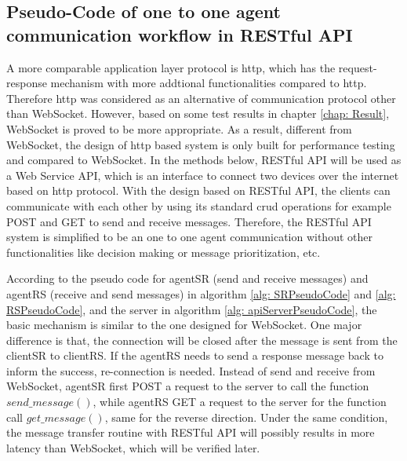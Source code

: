 \subsection{Pseudo-Code of one to one agent communication workflow in RESTful API}
A more comparable application layer protocol is \gls{http}, which has the request-response mechanism with more addtional functionalities compared to \gls{http}. 
Therefore \gls{http} was considered as an alternative of communication protocol other than WebSocket. 
However, based on some test results in chapter \ref{chap: Result}, WebSocket is 
proved to be more appropriate.
As a result, different from WebSocket, the design of \gls{http} based system is only built 
for performance testing and compared to WebSocket. In the methods below, RESTful API will be used 
as a Web Service API, which is an interface to connect two devices over the internet based on 
\gls{http} protocol. With the design based on RESTful API, the clients can communicate with each other 
by using its standard \gls{crud} operations for example POST and GET to send and receive messages. 
Therefore, the RESTful API system is simplified to be an one to one agent communication without other functionalities like decision making or message prioritization, etc.

According to the pseudo code for agentSR (send and receive messages) and 
agentRS (receive and send messages) in 
algorithm \ref{alg: SRPseudoCode} and \ref{alg: RSPseudoCode}, and the server 
in algorithm \ref{alg: apiServerPseudoCode}, 
the basic mechanism is similar to the one designed for WebSocket. One major 
difference is that, the connection will be closed after the message is sent 
from the clientSR to clientRS.
If the agentRS needs to send a response message back to inform the success, 
re-connection is needed. 
Instead of send and receive from WebSocket, agentSR first POST a request to the server to call the function $send\_message()$, 
while agentRS GET a request to the server for the function call $get\_message()$, same for the reverse direction. 
Under the same condition, the message transfer routine with RESTful API will possibly results in more latency than WebSocket, which will be verified later.
  
